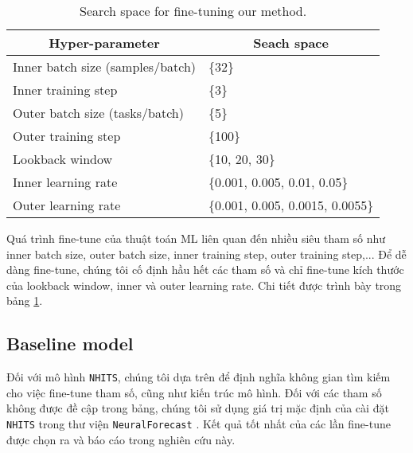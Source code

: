 \begin{table}[H]
    \centering
    \caption{Search space for fine-tuning our method.}
    \label{tab:our_finetune}
    \begin{tabular}{ll} 
    \toprule
    \multicolumn{1}{c}{Hyper-parameter} & \multicolumn{1}{c}{Seach space}   \\ 
    \hline
    Inner batch size (samples/batch)    & \{32\}                            \\
    Inner training step                 & \{3\}                             \\
    Outer batch size (tasks/batch)      & \{5\}                             \\
    Outer training step                 & \{100\}                           \\ 
    \hline
    Lookback window                     & \{10, 20, 30\}                    \\
    Inner learning rate                 & \{0.001, 0.005, 0.01, 0.05\}      \\
    Outer learning rate                 & \{0.001, 0.005, 0.0015, 0.0055\}  \\
    \bottomrule
    \end{tabular}
\end{table}

Quá trình fine-tune của thuật toán ML liên quan đến nhiều siêu tham số như inner batch size, outer batch size, inner training step, outer training step,... Để dễ dàng fine-tune, chúng tôi cố định hầu hết các tham số và chỉ fine-tune kích thước của lookback window, inner và outer learning rate. Chi tiết được trình bày trong bảng \ref{tab:our_finetune}.


\subsection{Baseline model}

Đối với mô hình \verb|NHITS|, chúng tôi dựa trên \cite{challu2023nhits} để định nghĩa không gian tìm kiếm cho việc fine-tune tham số, cũng như kiến trúc mô hình. Đối với các tham số không được đề cập trong bảng, chúng tôi sử dụng giá trị mặc định của cài đặt \verb|NHITS| trong thư viện \verb|NeuralForecast| \cite{neuralforecast}. Kết quả tốt nhất của các lần fine-tune được chọn ra và báo cáo trong nghiên cứu này.

